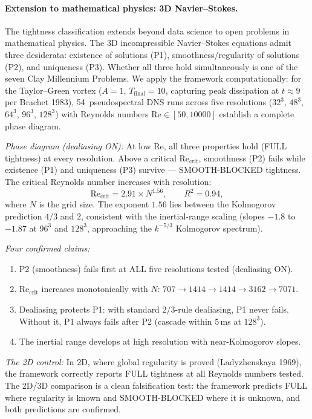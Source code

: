 \documentclass[11pt,a4paper]{article}
\begin{document}
\paragraph{Extension to mathematical physics: 3D Navier--Stokes.}
The tightness classification extends beyond data science to open problems in mathematical physics.  The 3D incompressible Navier--Stokes equations admit three desiderata: existence of solutions (P1), smoothness/regularity of solutions (P2), and uniqueness (P3).  Whether all three hold simultaneously is one of the seven Clay Millennium Problems.  We apply the framework computationally: for the Taylor--Green vortex ($A = 1$, $T_{\mathrm{final}} = 10$, capturing peak dissipation at $t \approx 9$ per Brachet 1983), 54~pseudospectral DNS runs across five resolutions ($32^3$, $48^3$, $64^3$, $96^3$, $128^3$) with Reynolds numbers $\mathrm{Re} \in [50, 10000]$ establish a complete phase diagram.

\emph{Phase diagram (dealiasing ON):}
At low Re, all three properties hold (FULL tightness) at every resolution.  Above a critical $\mathrm{Re}_{\mathrm{crit}}$, smoothness (P2) fails while existence (P1) and uniqueness (P3) survive --- SMOOTH-BLOCKED tightness.  The critical Reynolds number increases with resolution:
\[
  \mathrm{Re}_{\mathrm{crit}} = 2.91 \times N^{1.56}, \qquad R^2 = 0.94,
\]
where $N$ is the grid size.  The exponent $1.56$ lies between the Kolmogorov prediction $4/3$ and $2$, consistent with the inertial-range scaling (slopes $-1.8$ to $-1.87$ at $96^3$ and $128^3$, approaching the $k^{-5/3}$ Kolmogorov spectrum).

\emph{Four confirmed claims:}
\begin{enumerate}
  \item P2 (smoothness) fails first at ALL five resolutions tested (dealiasing ON).
  \item $\mathrm{Re}_{\mathrm{crit}}$ increases monotonically with $N$: $707 \to 1414 \to 1414 \to 3162 \to 7071$.
  \item Dealiasing protects P1: with standard $2/3$-rule dealiasing, P1 never fails.  Without it, P1 always fails after P2 (cascade within 5\,ms at $128^3$).
  \item The inertial range develops at high resolution with near-Kolmogorov slopes.
\end{enumerate}

\emph{The 2D control:} In 2D, where global regularity is proved (Ladyzhenskaya 1969), the framework correctly reports FULL tightness at all Reynolds numbers tested.  The 2D/3D comparison is a clean falsification test: the framework predicts FULL where regularity is known and SMOOTH-BLOCKED where it is unknown, and both predictions are confirmed.
\end{document}
